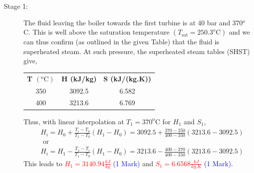 \documentclass[12pt,twoside]{report}
\newcommand{\frc}{\displaystyle\frac}
\begin{document}
\begin{description}
\begin{enumerate}[(a)]
\begin{description}
\item [Stage 1:] The fluid leaving the boiler towards the first turbine is at 40 bar and 370$^{o}$C. This is well above the saturation temperature $\left(T_{\text{sat}}=250.3^{\text{o}}\text{C}\right)$ and we can thus confirm (as outlined in the given Table) that the fluid is superheated steam. At such pressure, the superheated steam tables (SHST) give,
\begin{center}
\begin{tabular}{c c c}
{\bf T $\left(^{\text{o}}\text{C}\right)$} & {\bf H (kJ/kg)}  & {\bf S (kJ/(kg.K))} \\ 
350                                      & 3092.5           & 6.582               \\
400                                      & 3213.6           & 6.769               \\ 
\end{tabular}
\end{center}
Thus, with linear interpolation at $T_{1}=370^{\text{o}}\text{C}$ for $H_{1}$ and $S_{1}$,
\begin{eqnarray}
&& H_{i} = H_{0} + \frc{T_{i}-T_{0}}{T_{1}-T_{0}}\left(H_{1}-H_{0}\right) = 3092.5 + \frc{370-350}{400-350}\left(3213.6-3092.5\right) \nonumber \\
&& \text{ or } \nonumber \\
&& H_{i} = H_{1} - \frc{T_{1}-T_{i}}{T_{1}-T_{0}}\left(H_{1}-H_{0}\right) = 3213.6 - \frc{400-370}{400-350}\left(3213.6-3092.5\right) \nonumber 
\end{eqnarray}
This leads to \textcolor{red}{$H_{1}=3140.94\frc{kJ}{kg}$} \textcolor{blue}{(1 Mark)} and \textcolor{red}{$S_{1}=6.6568\frc{kJ}{kg.K}$} \textcolor{blue}{(1 Mark)}.


\end{description}
\end{enumerate}
\end{description}
\end{document}
